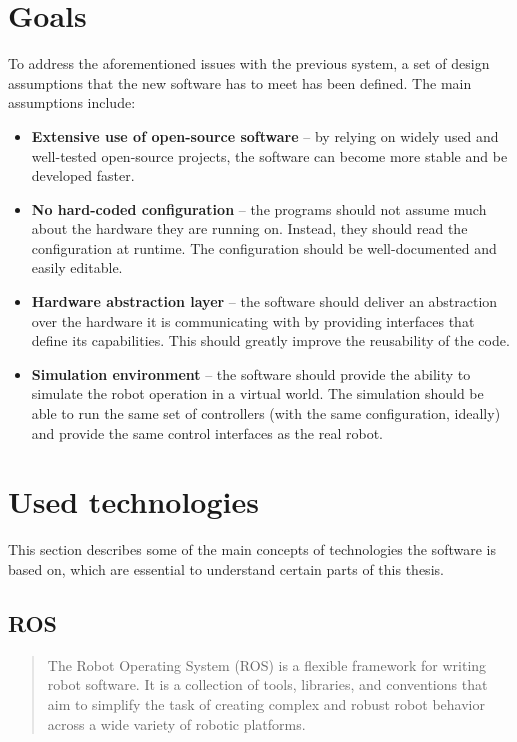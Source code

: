 \documentclass[english,inz,shortabstract]{iithesis}
\begin{document}
\section{Goals} \label{goals}
To address the aforementioned issues with the previous system, a set of design assumptions that the new software has to meet has been defined. The main assumptions include:

\begin{itemize}
	\item \textbf{Extensive use of open-source software} -- by relying on widely used and well-tested open-source projects, the software can become more stable and be developed faster.
	\item \textbf{No hard-coded configuration} -- the programs should not assume much about the hardware they are running on. Instead, they should read the configuration at runtime. The configuration should be well-documented and easily editable.
	\item \textbf{Hardware abstraction layer} -- the software should deliver an abstraction over the hardware it is communicating with by providing interfaces that define its capabilities. This should greatly improve the reusability of the code. 
	\item \textbf{Simulation environment} -- the software should provide the ability to simulate the robot operation in a virtual world. The simulation should be able to run the same set of controllers (with the same configuration, ideally) and provide the same control interfaces as the real robot.
\end{itemize}


\section{Used technologies}
This section describes some of the main concepts of technologies the software is based on, which are essential to understand certain parts of this thesis.

	\subsection{ROS}
	\begin{quote}
		The Robot Operating System (ROS) is a flexible framework for writing robot software. It is a collection of tools, libraries, and conventions that aim to simplify the task of creating complex and robust robot behavior across a wide variety of robotic platforms.
		\cite{ros:about}
	\end{quote}
\end{document}
